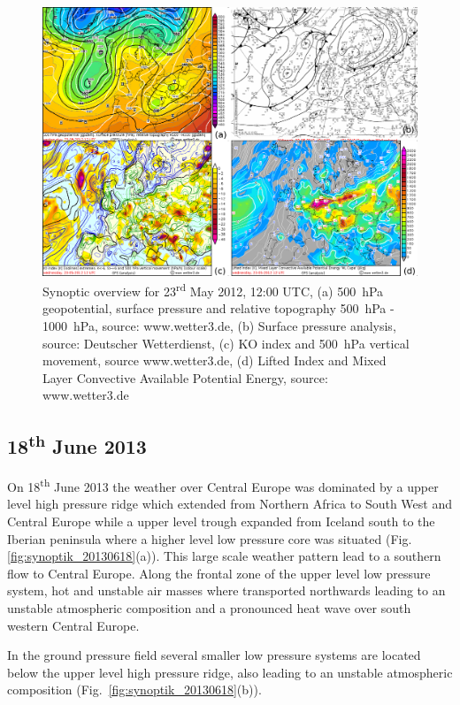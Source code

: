 \begin{figure}[htbp]
	\centering
	\includegraphics[width=\linewidth]{Grafiken/Abbildungen/synoptik_20120523.png}
	\caption{Synoptic overview for 23\textsuperscript{rd} May 2012, 12:00 UTC, (a) \SI{500}{\hecto\pascal} geopotential, surface pressure and relative topography \SI{500}{\hecto\pascal} - \SI{1000}{\hecto\pascal}, source: www.wetter3.de, (b) Surface pressure analysis, source: Deutscher Wetterdienst, (c) KO index and \SI{500}{\hecto\pascal} vertical movement, source www.wetter3.de, (d) Lifted Index and Mixed Layer Convective Available Potential Energy, source: www.wetter3.de}
    \label{fig:synoptik_20120523}  
\end{figure}

\subsection{18\textsuperscript{th} June 2013}
On 18\textsuperscript{th} June 2013 the weather over Central Europe was dominated by a upper level high pressure ridge which extended from Northern Africa to South West and Central Europe while a upper level trough expanded from Iceland south to the Iberian peninsula where a higher level low pressure core was situated (Fig.~ \ref{fig:synoptik_20130618}(a)). This large scale weather pattern lead to a southern flow to Central Europe. Along the frontal zone of the upper level low pressure system, hot and unstable air masses where transported northwards leading to an unstable atmospheric composition and a pronounced heat wave over south western Central Europe.

In the ground pressure field several smaller low pressure systems are located below the upper level high pressure ridge, also leading to an unstable atmospheric composition (Fig.~\ref{fig:synoptik_20130618}(b)). 

